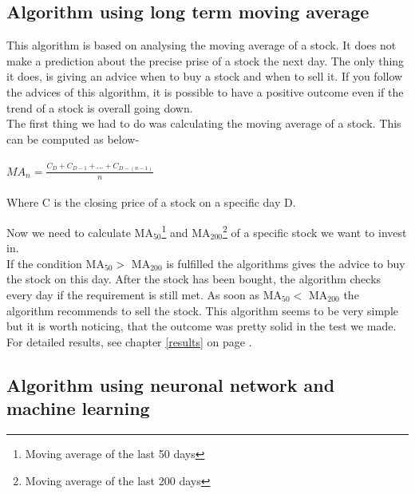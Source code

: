 \documentclass[conference]{IEEEtran}
\begin{document}
\subsection{Algorithm using long term moving average}

This algorithm is based on analysing the moving average of a stock. It does not make a prediction about the precise prise of a stock the next day. The only thing it does, is giving an advice when to buy a stock and when to sell it. If you follow the advices of this algorithm, it is possible to have a positive outcome even if the trend of a stock is overall going down.
\\
The first thing we had to do was calculating the moving average of a stock. This can be computed as below-
\\
\\
$ MA_{n} =  \frac{C_{D} + C_{D-1} + ... + C_{D-(n-1)}}{n} $
\\
\\
Where C is the closing price of a stock on a specific day D.

Now we need to calculate MA$ _{50} $\footnote{Moving average of the last 50 days} and MA$ _{200} $\footnote{Moving average of the last 200 days} of a specific stock we want to invest in.
\\
If the condition MA$ _{50} >$  MA$ _{200} $ is fulfilled the algorithms gives the advice to buy the stock on this day. After the stock has been bought, the algorithm checks every day if the requirement is still met. As soon as MA$ _{50} <$  MA$ _{200} $ the algorithm recommends to sell the stock. This algorithm seems to be very simple but it is worth noticing, that the outcome was pretty solid in the test we made. For detailed results, see chapter \ref{results} on page  \pageref{results}.



\subsection{Algorithm using neuronal network and machine learning}
\end{document}
